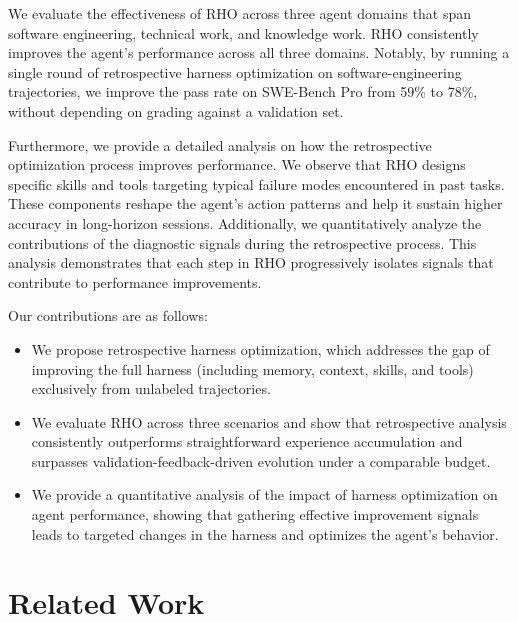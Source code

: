 \documentclass{llmxive}
\providecommand{\method}{\textsc{RHO}}
\begin{document}
 We evaluate the effectiveness of \method{} across three agent domains that span software engineering, technical work, and knowledge work.
\method{} consistently improves the agent's performance across all three domains.
Notably, by running a single round of retrospective harness optimization on software-engineering trajectories, we improve the pass rate on SWE-Bench Pro \citep{deng2025swebenchpro} from 59\% to 78\%, without depending on grading against a validation set.

 Furthermore, we provide a detailed analysis on how the retrospective optimization process improves performance.
We observe that \method{} designs specific skills and tools targeting typical failure modes encountered in past tasks. These components reshape the agent's action patterns and help it sustain higher accuracy in long-horizon sessions.
Additionally, we quantitatively analyze the contributions of the diagnostic signals during the retrospective process.
This analysis demonstrates that each step in \method{} progressively isolates signals that contribute to performance improvements.

 Our contributions are as follows:
\begin{itemize}[label=$\diamond$]
    \item We propose retrospective harness optimization, which addresses the gap of improving the full harness (including memory, context, skills, and tools) exclusively from unlabeled trajectories.
    \item We evaluate \method{} across three scenarios and show that retrospective analysis consistently outperforms straightforward experience accumulation and surpasses validation-feedback-driven evolution under a comparable budget.
    \item We provide a quantitative analysis of the impact of harness optimization on agent performance, showing that gathering effective improvement signals leads to targeted changes in the harness and optimizes the agent's behavior.
\end{itemize}

\section{Related Work}
\label{sec:related}
\end{document}
